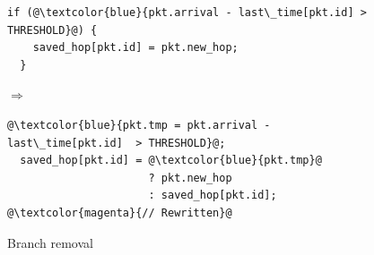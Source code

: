 


\begin{figure}[!t]
  \hspace{-0.3in}
  \begin{minipage}{0.55\textwidth}
  \begin{small}
  \begin{lstlisting}[style=customc, numbers=none, frame=none]
  if (@\textcolor{blue}{pkt.arrival - last\_time[pkt.id] > THRESHOLD}@) {
    saved_hop[pkt.id] = pkt.new_hop;
  }
  \end{lstlisting}
  \end{small}
  \end{minipage}
%  
  \hspace{-0.5in}
  $\Longrightarrow$ 
  \hspace{-0.3in}
%  
  \begin{minipage}{0.6\textwidth}
  \begin{small}
  \begin{lstlisting}[style=customc, numbers=none, frame=none]
  @\textcolor{blue}{pkt.tmp = pkt.arrival - last\_time[pkt.id]  > THRESHOLD}@;
  saved_hop[pkt.id] = @\textcolor{blue}{pkt.tmp}@
                      ? pkt.new_hop
                      : saved_hop[pkt.id]; @\textcolor{magenta}{// Rewritten}@
  \end{lstlisting}
  \end{small}
  \end{minipage}
\caption{Branch removal}
\label{fig:if_convert}
\end{figure}

